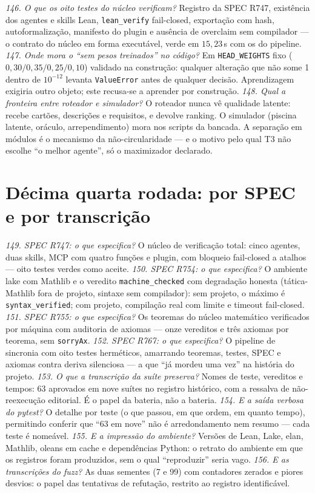 \textit{146. O que os oito testes do núcleo verificam?} Registro da SPEC R747, existência dos agentes e skills Lean, \texttt{lean\_verify} fail-closed, exportação com hash, autoformalização, manifesto do plugin e ausência de overclaim sem compilador --- o contrato do núcleo em forma executável, verde em $15{,}23$\,s com os do pipeline.
\textit{147. Onde mora o ``sem pesos treinados'' no código?} Em \texttt{HEAD\_WEIGHTS} fixo ($0{,}30/0{,}35/0{,}25/0{,}10$) validado na construção: qualquer alteração que não some 1 dentro de $10^{-12}$ levanta \texttt{ValueError} antes de qualquer decisão. Aprendizagem exigiria outro objeto; este recusa-se a aprender por construção.
\textit{148. Qual a fronteira entre roteador e simulador?} O roteador nunca vê qualidade latente: recebe cartões, descrições e requisitos, e devolve ranking. O simulador (piscina latente, oráculo, arrependimento) mora nos scripts da bancada. A separação em módulos é o mecanismo da não-circularidade --- e o motivo pelo qual T3 não escolhe ``o melhor agente'', só o maximizador declarado.
\section{Décima quarta rodada: por SPEC e por transcrição}
\textit{149. SPEC R747: o que especifica?} O núcleo de verificação total: cinco agentes, duas skills, MCP com quatro funções e plugin, com bloqueio fail-closed a atalhos --- oito testes verdes como aceite.
\textit{150. SPEC R754: o que especifica?} O ambiente lake com Mathlib e o veredito \texttt{machine\_checked} com degradação honesta (tática-Mathlib fora de projeto, sintaxe sem compilador): sem projeto, o máximo é \texttt{syntax\_verified}; com projeto, compilação real com limite e timeout fail-closed.
\textit{151. SPEC R755: o que especifica?} Os teoremas do núcleo matemático verificados por máquina com auditoria de axiomas --- onze vereditos e três axiomas por teorema, sem \texttt{sorryAx}.
\textit{152. SPEC R767: o que especifica?} O pipeline de sincronia com oito testes herméticos, amarrando teoremas, testes, SPEC e axiomas contra deriva silenciosa --- a que ``já mordeu uma vez'' na história do projeto.
\textit{153. O que a transcrição da suíte preserva?} Nomes de teste, vereditos e tempos: 63 aprovados em nove suítes no registro histórico, com a ressalva de não-reexecução editorial. É o papel da bateria, não a bateria.
\textit{154. E a saída verbosa do pytest?} O detalhe por teste (o que passou, em que ordem, em quanto tempo), permitindo conferir que ``63 em nove'' não é arredondamento nem resumo --- cada teste é nomeável.
\textit{155. E a impressão do ambiente?} Versões de Lean, Lake, elan, Mathlib, oleans em cache e dependências Python: o retrato do ambiente em que os registros foram produzidos, sem o qual ``reproduzir'' seria vago.
\textit{156. E as transcrições do fuzz?} As duas sementes (7 e 99) com contadores zerados e piores desvios: o papel das tentativas de refutação, restrito ao registro identificável.

